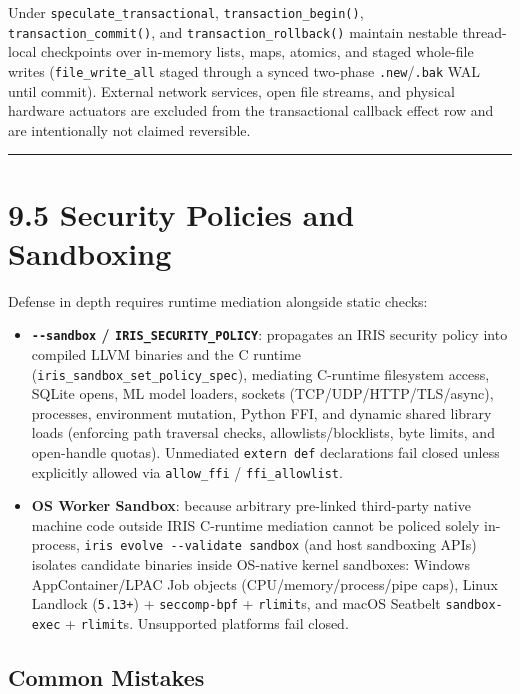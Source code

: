 \documentclass[
  english,
  oneside]{book}
\providecommand{\tightlist}{%
  \setlength{\itemsep}{0pt}\setlength{\parskip}{0pt}}
\begin{document}
Under \texttt{speculate\_transactional}, \texttt{transaction\_begin()},
\texttt{transaction\_commit()}, and \texttt{transaction\_rollback()}
maintain nestable thread-local checkpoints over in-memory lists, maps,
atomics, and staged whole-file writes (\texttt{file\_write\_all} staged
through a synced two-phase \texttt{.new}/\texttt{.bak} WAL until
commit). External network services, open file streams, and physical
hardware actuators are excluded from the transactional callback effect
row and are intentionally not claimed reversible.

\begin{center}\rule{0.5\linewidth}{0.5pt}\end{center}

\section{9.5 Security Policies and
Sandboxing}\label{security-policies-and-sandboxing}

Defense in depth requires runtime mediation alongside static checks:

\begin{itemize}
\tightlist
\item
  \textbf{\texttt{-\/-sandbox} / \texttt{IRIS\_SECURITY\_POLICY}}:
  propagates an IRIS security policy into compiled LLVM binaries and the
  C runtime (\texttt{iris\_sandbox\_set\_policy\_spec}), mediating
  C-runtime filesystem access, SQLite opens, ML model loaders, sockets
  (TCP/UDP/HTTP/TLS/async), processes, environment mutation, Python FFI,
  and dynamic shared library loads (enforcing path traversal checks,
  allowlists/blocklists, byte limits, and open-handle quotas).
  Unmediated \texttt{extern\ def} declarations fail closed unless
  explicitly allowed via \texttt{allow\_ffi} / \texttt{ffi\_allowlist}.
\item
  \textbf{OS Worker Sandbox}: because arbitrary pre-linked third-party
  native machine code outside IRIS C-runtime mediation cannot be policed
  solely in-process, \texttt{iris\ evolve\ -\/-validate\ sandbox} (and
  host sandboxing APIs) isolates candidate binaries inside OS-native
  kernel sandboxes: Windows AppContainer/LPAC Job objects
  (CPU/memory/process/pipe caps), Linux Landlock (\texttt{5.13+}) +
  \texttt{seccomp-bpf} + \texttt{rlimit}s, and macOS Seatbelt
  \texttt{sandbox-exec} + \texttt{rlimit}s. Unsupported platforms fail
  closed.
\end{itemize}

\subsection{Common Mistakes}\label{common-mistakes-8}
\end{document}
